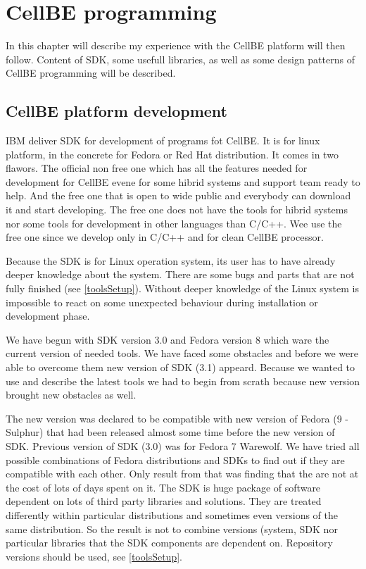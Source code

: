 \chapter {CellBE programming} 
\par
In this chapter will describe my experience with the CellBE platform will then follow.
Content of SDK, some usefull libraries, as well as some design patterns of CellBE programming will be described.

\section{CellBE platform development}
\par
IBM deliver SDK for development of programs fot CellBE.
It is for linux platform, in the concrete for Fedora or Red Hat distribution.
It comes in two flawors.
The official non free one which has all the features needed for development for CellBE evene for some hibrid systems and support team ready to help.
And the free one that is open to wide public and everybody can download it and start developing.
The free one does not have the tools for hibrid systems nor some tools for development in other languages than C/C++.
Wee use the free one since we develop only in C/C++ and for clean CellBE processor.

\par
Because the SDK is for Linux operation system, its user has to have already deeper knowledge about the system.
There are some bugs and parts that are not fully finished (see \ref{toolsSetup}).
Without deeper knowledge of the Linux system is impossible to react on some unexpected behaviour during installation or development phase.

\par
We have begun with SDK version 3.0 and Fedora version 8 which ware the current version of needed tools.
We have faced some obstacles and before we were able to overcome them new version of SDK (3.1) appeard.
Because we wanted to use and describe the latest tools we had to begin from scrath because new version brought new obstacles as well.

\par
The new version was declared to be compatible with new version of Fedora (9 - Sulphur) that had been released almost some time before the new version of SDK.
Previous version of SDK (3.0) was for Fedora 7 Warewolf.
We have tried all possible combinations of Fedora distributions and SDKs to find out if they are compatible with each other.
Only result from that was finding that the are not at the cost of lots of days spent on it.
The SDK is huge package of software dependent on lots of third party libraries and solutions.
They are treated differently within particular distributions and sometimes even versions of the same distribution.
So the result is not to combine versions (system, SDK nor particular libraries that the SDK components are dependent on.
Repository versions should be used, see \ref{toolsSetup}.

